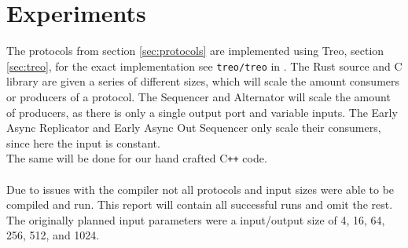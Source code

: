 \section{Experiments}
The protocols from section \ref{sec:protocols} are implemented using Treo, section \ref{sec:treo}, for the exact implementation see \verb|treo/treo| in \cite{us:git}. The Rust source and C library are given a series of different sizes, which will scale the amount consumers or producers of a protocol. The Sequencer and Alternator will scale the amount of producers, as there is only a single output port and variable inputs. The Early Async Replicator and Early Async Out Sequencer only scale their consumers, since here the input is constant.\\
The same will be done for our hand crafted C\texttt{++} code.\\\\
%
Due to issues with the compiler not all protocols and input sizes were able to be compiled and run. This report will contain all successful runs and omit the rest. The originally planned input parameters were a input/output size of 4, 16, 64, 256, 512, and 1024.
